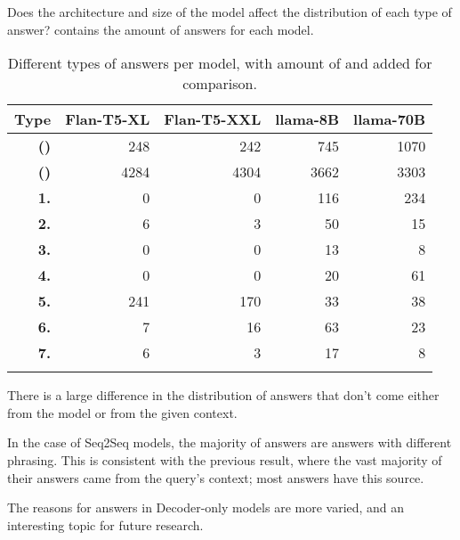 Does the architecture and size of the model affect the distribution of each type of \Other{} answer?
 contains the amount of answers for each model.

\begin{table}[ht]
	\centering
	\footnotesize
	\begin{tabular}{>{\bfseries}r | r r r r}
		\toprule
			\bfseries Type & \ttfamily\scriptsize Flan-T5-XL & \ttfamily\scriptsize Flan-T5-XXL & \ttfamily\scriptsize llama-8B & \ttfamily\scriptsize llama-70B \\
		\midrule
			(\Pc{}) & 248 & 242 & 745 & 1070 \\
			(\Cc{}) & 4284 & 4304 & 3662 & 3303 \\
		\midrule
			1. & 0 & 0 & 116 & 234 \\
			2. & 6 & 3 & 50 & 15 \\
			3. & 0 & 0 & 13 & 8 \\
			4. & 0 & 0 & 20 & 61 \\
			5. & 241 & 170 & 33 & 38 \\
			6. & 7 & 16 & 63 & 23 \\
			7. & 6 & 3 & 17 & 8 \\
		\bottomrule \addlinespace[4pt]
	\end{tabular}
	\caption{Different types of \Other{} answers per model, with amount of \Parametric{} and \Contextual{} added for comparison.}
	\label{other_results_category}
\end{table}

There is a large difference in the distribution of answers that don't come either from the model or from the given context.

In the case of Seq2Seq models, the majority of \Other{} answers are \Contextual{} answers with different phrasing.
This is consistent with the previous result, where the vast majority of their answers came from the query's context; most \Other{} answers have this source.

The reasons for \Other{} answers in Decoder-only models are more varied, and an interesting topic for future research.
